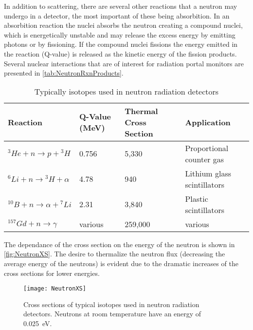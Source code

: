 In addition to scattering, there are several other reactions that a neutron may undergo in a detector, the most important of these being absorbition.
In an absorbition reaction the nuclei absorbs the neutron creating a compound nuclei, which is energetically unstable and may release the excess energy by emitting photons or by fissioning.
If the compound nuclei fissions the energy emitted in the reaction (Q-value) is released as the kinetic energy of the fission products.
Several nuclear interactions that are of interest for radiation portal monitors are presented in \autoref{tab:NeutronRxnProducts}.
\begin{table}
	\caption[Neutron Reactions and Reaction Energies]{Typically isotopes used in neutron radiation detectors}
	\label{tab:NeutronRxnProducts}
	\centering
	\begin{tabular}{ m{4cm} | m{1.5cm} m{1.5cm} p{5.5cm}} 
		\toprule
		Reaction                           & Q-Value (MeV) & Thermal Cross Section & Application \\
		\midrule
		${}^3He + n \to p +{}^3H$          & 0.756     & 5,330 & Proportional counter gas \\
		${}^6Li + n \to {}^3H + \alpha$    & 4.78      & 940 & Lithium glass scintillators \\
		${}^{10}B + n \to \alpha + {}^7Li$ & 2.31      & 3,840 & Plastic scintillators \\
		${}^{157}Gd + n \to \gamma$        &various    & 259,000 & various \\
		\bottomrule
	\end{tabular}
\end{table}
The dependance of the cross section on the energy of the neutron is shown in \autoref{fig:NeutronXS}.
The desire to thermalize the neutron flux (decreasing the average energy of the neutrons) is evident due to the dramatic increases of the cross sections for lower energies.
\begin{figure}
	\centering
	\texttt{[image: NeutronXS]}
	\caption[Neutron Reaction Cross Sections]{Cross sections of typical isotopes used in neutron radiation detectors.  Neutrons at room temperature have an energy of \SI{0.025}{\eV}.}
	\label{fig:NeutronXS}
\end{figure}
